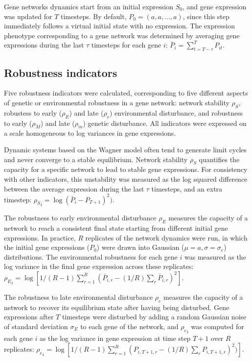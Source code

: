\documentclass[a4paper]{article}
\newcommand{\stability}{{\rho_S}}
\newcommand{\earlyenv}{{\rho_E}}
\newcommand{\lateenv}{{\rho_e}}
\newcommand{\earlymut}{{\rho_M}}
\newcommand{\latemut}{{\rho_m}}
\begin{document}
Gene networks dynamics start from an initial expression $S_0$, and gene expression was updated for $T$ timesteps. By default, $P_0 = (a, a, ..., a)$, since this step immediately follows a virtual initial state with no expression. The expression phenotype corresponding to a gene network was determined by averaging gene expressions during the last $\tau$ timesteps for each gene $i$: $\bar P_i = \sum_{t=T-\tau}^T P_{it}$. 

\subsection{Robustness indicators}

Five robustness indicators were calculated, corresponding to five different aspects of genetic or environmental robustness in a gene network: network stability $\stability$, robustess to early ($\earlyenv$) and late ($\lateenv$) environmental disturbance, and robustness to early ($\earlymut$) and late ($\latemut$) genetic disturbance. All indicators were expressed on a scale homogeneous to log variances in gene expressions.

Dynamic systems based on the Wagner model often tend to generate limit cycles and never converge to a stable equilibrium. Network stability $\stability$ quantifies the capacity for a specific network to lead to stable gene expressions.  For consistency with other indicators, this unstability was measured as the log squared difference between the average expression during the last $\tau$ timesteps, and an extra timestep: $\stability_i = \log( \bar P_i - P_{T+1})^2)$. 

The robustness to early environmental disturbance $\earlyenv$ measures the capacity of a network to reach a consistent final state starting from different initial gene expressions. In practice, $R$ replicates of the network dynamics were run, in which the initial gene expressions ($P_0$) were drawn into Gaussian ($\mu = a, \sigma = \sigma_e$) distributions. The environmental robustness for each gene $i$ was measured as the log variance in the final gene expression across these replicates: $\earlyenv_i = \log [ 1/(R-1) \sum_{r=1}^R (\bar P_{i,r} - (1/R) \sum _r \bar P_{i,r})^2 ]$. 

The robustness to late environmental disturbance $\lateenv$ measures the capacity of a network to recover its equilibrium state after having being disturbed. Gene expressions after $T$ timesteps were disturbed by adding a random Gaussian noise of standard deviation $\sigma_E$ to each gene of the network, and $\lateenv_i$ was computed for each gene $i$ as the log variance in gene expression at time step $T+1$ over $R$ replicates: $\lateenv_i = \log [ 1/(R-1) \sum_{r=1}^R (P_{i,T+1,r} - (1/R) \sum_r P_{i,T+1,r})^2)]$. 
\end{document}
